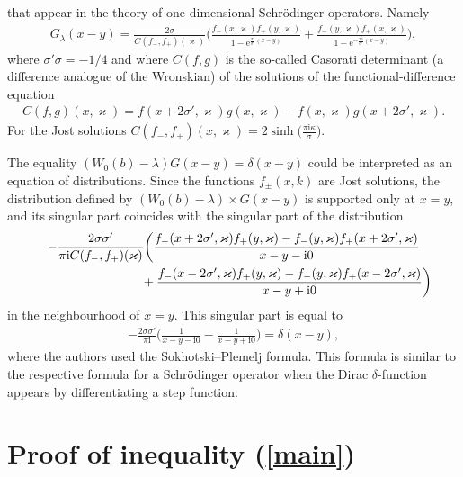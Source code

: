 \documentclass[pdftex]{sigma}%
\numberwithin{equation}{section}
\newcommand{\e}{\mathrm{e}}
\newcommand{\ii}{\mathrm{i}}
\begin{document}
that appear in the theory of one-dimensional Schr\"odinger operators. Namely
\begin{gather*}
G_\lambda(x-y) = \frac{2\sigma}{C(f_-,f_+)(\varkappa)}
\bigg(\frac{f_-(x, \varkappa) f_+(y, \varkappa)}{1 - \e^{\frac{\pi \ii}{\sigma'} (x-y)}} +
\frac{f_-(y, \varkappa) f_+(x, \varkappa)}{1 - \e^{-\frac{\pi \ii}{\sigma'} (x-y)}} \bigg),
\end{gather*}
where $\sigma' \sigma = -1/4$ and where $C(f,g)$ is the so-called Casorati determinant (a difference analogue of the Wronskian) of the solutions of the functional-difference equation
\begin{gather*}
C(f,g)(x,\varkappa) = f(x+ 2\sigma', \varkappa)g(x,\varkappa) - f(x,\varkappa) g(x + 2\sigma', \varkappa).
\end{gather*}
For the Jost solutions $C(f_-,f_+)(x,\varkappa) = 2\sinh\big(\frac{\pi \ii\kappa}{\sigma}\big)$.

The equality $(W_0(b) - \lambda)G(x-y) = \delta(x-y)$ could be interpreted as an equation of distributions.
Since the functions $f_{\pm}(x,k)$ are Jost solutions, the distribution defined by $(W_0(b) - \lambda)\times G(x-y)$ is supported only at $x = y$, and its singular part coincides with the singular part of the distribution
\begin{gather*}
-\frac{2\sigma\sigma'}{\pi \ii C(f_-,f_+)(\varkappa)} \bigg(\frac{f_-(x+2\sigma',\varkappa) f_+(y,\varkappa)- f_-(y,\varkappa)f_+(x+2\sigma',\varkappa)}{x-y-\ii0}
\\ \hphantom{-\frac{2\sigma\sigma'}{\pi \ii C(f_-,f_+)(\varkappa)} \bigg(}
{} + \frac{f_-(x-2\sigma',\varkappa) f_+(y,\varkappa)
- f_-(y,\varkappa)f_+(x-2\sigma',\varkappa)}{x-y+\ii0}\bigg)
\end{gather*}
in the neighbourhood of $x = y$. This singular part is equal to
\begin{gather*}
-\frac{2\sigma\sigma'}{\pi \ii} \bigg(\frac{1}{x-y-\ii0} - \frac{1}{x-y+\ii0} \bigg) = \delta(x-y),
\end{gather*}
where the authors used the Sokhotski--Plemelj formula. This formula is similar to the respective formula for a Schr\"odinger operator when the Dirac $\delta$-function appears by differentiating a step function.

\section[Proof of inequality (1.2)]{Proof of inequality (\ref{main})}
\end{document}
